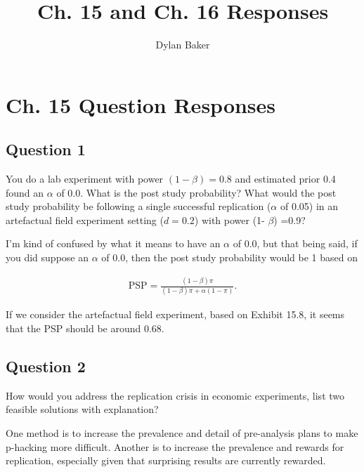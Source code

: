 \documentclass[10pt]{article}
\title{Ch. 15 and Ch. 16 Responses}
\author{Dylan Baker}
\begin{document}
\maketitle

\tableofcontents

\section{Ch. 15 Question Responses}

\subsection{Question 1}

You do a lab experiment with power $(1- \beta)=0.8$ and estimated 
prior 0.4 found an $\alpha$ of 0.0. 
What is the post study probability? 
What would the post study probability be 
following a single successful replication 
($\alpha$ of 0.05) in an artefactual field 
experiment setting ($d=0.2$) with power (1- $\beta$) =0.9?

\hrulefill\hspace{0.5em}\dotfill\hspace{0.5em}\hrulefill

I'm kind of confused by what it means to have an $\alpha$ of 0.0,
but that being said, if you did suppose an $\alpha$ of 0.0, then
the post study probability would be 1 based on

\begin{align}
    \text{PSP}=\frac{(1-\beta) \pi}{(1-\beta) \pi+\alpha(1-\pi)} .
\end{align}

If we consider the artefactual field experiment,
based on Exhibit 15.8, it seems that the 
PSP should be around 0.68. 


\subsection{Question 2}

How would you address the replication crisis in economic experiments, list two feasible solutions with explanation?

\hrulefill\hspace{0.5em}\dotfill\hspace{0.5em}\hrulefill

One method is to increase the prevalence and 
detail of pre-analysis plans to make p-hacking 
more difficult. Another is to 
increase the prevalence and rewards for replication,
especially given that surprising results are currently rewarded.
\end{document}
